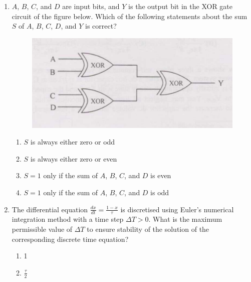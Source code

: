 \documentclass[journal]{IEEEtran}
\numberwithin{equation}{enumi}
\numberwithin{figure}{enumi}
\begin{document}
\begin{enumerate}
\begin{figure}[!ht]
    \caption{}
\end{figure}
\begin{multicols}{4}
\begin{enumerate}
    \item 46\%
    \item 55\%
    \item 63\%
    \item 92\%
\end{enumerate}
\end{multicols}
\bigskip
\item $A$, $B$, $C$, and $D$ are input bits, and $Y$ is the output bit in the XOR gate circuit of the figure below. Which of the following statements about the sum $S$ of $A$, $B$, $C$, $D$, and $Y$ is correct?
\begin{figure}[!ht]
    \centering
    \includegraphics[width=\linewidth]{figs/5.png}
    \caption{}
\end{figure}
\begin{enumerate}
    \item $S$ is always either zero or odd
    \item $S$ is always either zero or even
    \item $S = 1$ only if the sum of $A$, $B$, $C$, and $D$ is even
    \item $S = 1$ only if the sum of $A$, $B$, $C$, and $D$ is odd
\end{enumerate}
    \bigskip
    \item The differential equation $\frac{dx}{dt} = \frac{1 - x}{\tau}$ is discretised using Euler's numerical integration method with a time step $\Delta T > 0$. What is the maximum permissible value of $\Delta T$ to ensure stability of the solution of the corresponding discrete time equation?
    \begin{multicols}{4}
    \begin{enumerate}
        \item 1
        \item $\frac{\tau}{2}$

\end{enumerate}
\end{multicols}
\end{enumerate}
\end{document}
